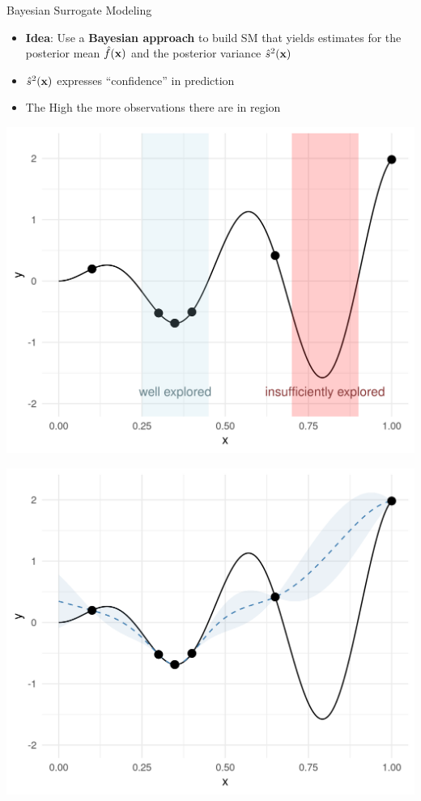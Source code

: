 \documentclass[11pt,compress,t,notes=noshow, xcolor=table]{beamer}
\begin{document}
\begin{vbframe}{Bayesian Surrogate Modeling}
\begin{itemize}
\item \textbf{Idea}: Use a \textbf{Bayesian approach} to build SM that yields estimates for the posterior mean $\hat{f}(\mathbf{x})$ and the posterior variance $\hat{s}^2(\mathbf{x})$
\item  $\hat{s}^2(\mathbf{x})$ expresses \enquote{confidence} in prediction
\item The High the more observations there are in region
\end{itemize}
\vspace{+.45cm}
\begin{minipage}[b]{0.45\textwidth}
  \includegraphics[width = \textwidth]{figure_man/bayesian_loop_ee.png}
\end{minipage}
\hfill
\begin{minipage}[b]{0.45\textwidth}
  \includegraphics[width = \textwidth]{figure_man/bayesian_loop_sm.png}
\end{minipage}


\end{vbframe}
\end{document}
